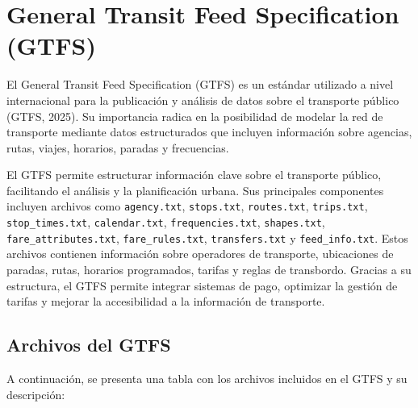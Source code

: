 \documentclass[openany]{book}
\begin{document}

    \section{General Transit Feed Specification (GTFS)}

    El General Transit Feed Specification (GTFS) es un estándar utilizado a nivel internacional para la publicación y análisis de datos sobre el transporte público (GTFS, 2025). Su importancia radica en la posibilidad de modelar la red de transporte mediante datos estructurados que incluyen información sobre agencias, rutas, viajes, horarios, paradas y frecuencias.

    El GTFS permite estructurar información clave sobre el transporte público, facilitando el análisis y la planificación urbana. Sus principales componentes incluyen archivos como \texttt{agency.txt}, \texttt{stops.txt}, \texttt{routes.txt}, \texttt{trips.txt}, \texttt{stop\_times.txt}, \texttt{calendar.txt}, \texttt{frequencies.txt}, \texttt{shapes.txt}, \texttt{fare\_attributes.txt}, \texttt{fare\_rules.txt}, \texttt{transfers.txt} y \texttt{feed\_info.txt}. Estos archivos contienen información sobre operadores de transporte, ubicaciones de paradas, rutas, horarios programados, tarifas y reglas de transbordo. Gracias a su estructura, el GTFS permite integrar sistemas de pago, optimizar la gestión de tarifas y mejorar la accesibilidad a la información de transporte.

    \subsection{Archivos del GTFS}

    A continuación, se presenta una tabla con los archivos incluidos en el GTFS y su descripción:
\end{document}
